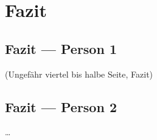 \chapter{Fazit}

\section{Fazit --- Person 1}

(Ungefähr viertel bis halbe Seite, Fazit)

\section{Fazit --- Person 2}

\dots